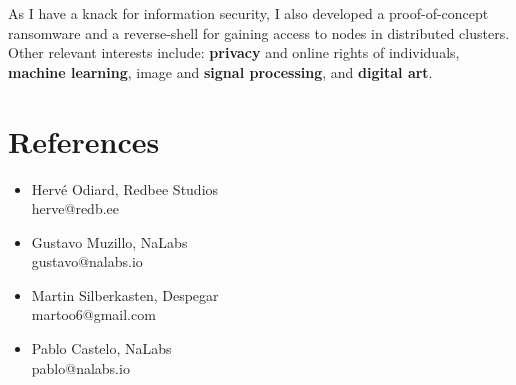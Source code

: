 \documentclass{vitae}
\begin{document}
As I have a knack for information security, I also developed a proof-of-concept ransomware and a reverse-shell for gaining access to nodes in distributed clusters.
Other relevant interests include: {\bf privacy} and online rights of individuals, {\bf machine learning}, image and {\bf signal processing}, and {\bf digital art}.

\section*{References}
\begin{multicols}{2}
    \begin{itemize}
    \item Hervé Odiard, Redbee Studios\\
    herve@redb.ee
    \item Gustavo Muzillo, NaLabs\\
    gustavo@nalabs.io
    \item Martin Silberkasten, Despegar\\
    martoo6@gmail.com
    \item Pablo Castelo, NaLabs\\
    pablo@nalabs.io
    \end{itemize}
\end{multicols}
\end{document}

